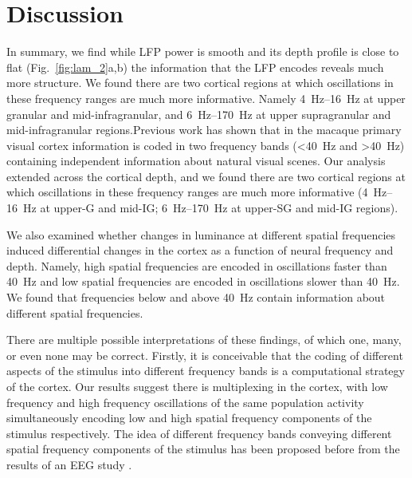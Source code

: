 \section{Discussion}
In summary, we find while \ac{LFP} power is smooth and its depth profile is close to flat (Fig.~\ref{fig:lam_2}a,b) the information that the \ac{LFP} encodes reveals much more structure.
We found there are two cortical regions at which oscillations in these frequency ranges are much more informative.
Namely \SIrange{4}{16}{Hz} at upper granular and mid-infragranular, and \SIrange{6}{170}{Hz} at upper supragranular and mid{}-infragranular regions.Previous work \citep{Belitski2008} has shown that in the macaque primary visual cortex information is coded in two frequency bands (\SI{<40}{Hz} and \SI{>40}{Hz}) containing independent information about natural visual scenes.
Our analysis extended across the cortical depth, and we found there are two cortical regions at which oscillations in these frequency ranges are much more informative (\SIrange{4}{16}{Hz} at upper-\ac{G} and mid-\ac{IG}; \SIrange{6}{170}{Hz} at upper-\ac{SG} and mid-\ac{IG} regions).

We also examined whether changes in luminance at different spatial frequencies induced differential changes in the cortex as a function of neural frequency and depth.
Namely, high spatial frequencies are encoded in oscillations faster than \SI{40}{Hz} and low spatial frequencies are encoded in oscillations slower than \SI{40}{Hz}.
We found that frequencies below and above \SI{40}{Hz} contain information about different spatial frequencies.

There are multiple possible interpretations of these findings, of which one, many, or even none may be correct.
Firstly, it is conceivable that the coding of different aspects of the stimulus into different frequency bands is a computational strategy of the cortex.
Our results suggest there is multiplexing in the cortex, with low frequency and high frequency oscillations of the same population activity simultaneously encoding low and high spatial frequency components of the stimulus respectively.
The idea of different frequency bands conveying different spatial frequency components of the stimulus has been proposed before from the results of an \ac{EEG} study \citep{Smith2006}.

